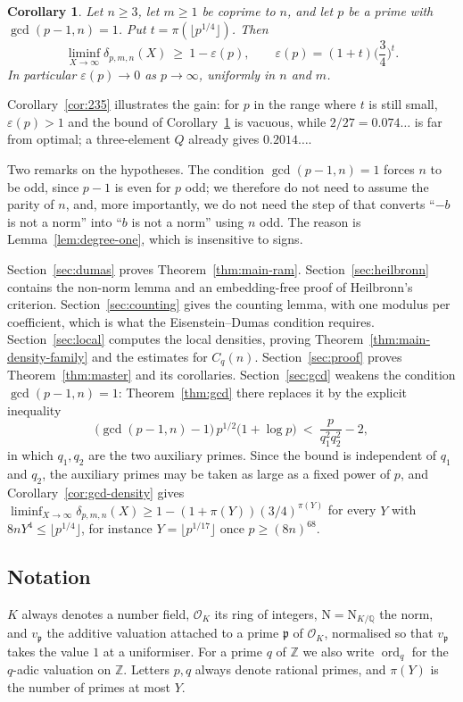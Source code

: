 \documentclass[11pt,reqno]{amsart}
\theoremstyle{plain}
\newtheorem{corollary}[theorem]{Corollary}
\theoremstyle{definition}
\theoremstyle{remark}
\newcommand{\Z}{\mathbb{Z}}
\newcommand{\Q}{\mathbb{Q}}
\newcommand{\OK}{\mathcal{O}_K}
\newcommand{\vp}{v_{\mathfrak{p}}}
\newcommand{\ord}{\operatorname{ord}}
\newcommand{\p}{\mathfrak{p}}
\newcommand{\N}{\mathrm{N}}
\begin{document}
\begin{corollary}\label{cor:eps}
Let $n\ge3$, let $m\ge1$ be coprime to $n$, and let $p$ be a prime with $\gcd(p-1,n)=1$. Put
$t=\pi(\lfloor p^{1/4}\rfloor)$. Then
\[
  \liminf_{X\to\infty}\delta_{p,m,n}(X)\ \ge\ 1-\varepsilon(p),
  \qquad
  \varepsilon(p)=(1+t)\Big(\frac34\Big)^{t} .
\]
In particular $\varepsilon(p)\to0$ as $p\to\infty$, uniformly in $n$ and $m$.
\end{corollary}

Corollary~\ref{cor:235} illustrates the gain: for $p$ in the range where $t$ is still small,
$\varepsilon(p)>1$ and the bound of Corollary~\ref{cor:eps} is vacuous, while $2/27=0.074\ldots$
is far from optimal; a three-element $Q$ already gives $0.2014\ldots$.

Two remarks on the hypotheses. The condition $\gcd(p-1,n)=1$ forces $n$ to be odd, since $p-1$ is
even for $p$ odd; we therefore do not need to assume the parity of $n$, and, more importantly, we
do not need the step of \cite{HMT} that converts ``$-b$ is not a norm'' into ``$b$ is not a norm''
using $n$ odd. The reason is Lemma~\ref{lem:degree-one}, which is insensitive to signs.

Section~\ref{sec:dumas} proves Theorem~\ref{thm:main-ram}. Section~\ref{sec:heilbronn} contains
the non-norm lemma and an embedding-free proof of Heilbronn's criterion.
Section~\ref{sec:counting} gives the counting lemma, with one modulus per coefficient, which is
what the Eisenstein--Dumas condition requires. Section~\ref{sec:local} computes the local
densities, proving Theorem~\ref{thm:main-density-family} and the estimates for $C_q(n)$.
Section~\ref{sec:proof} proves Theorem~\ref{thm:master} and its corollaries. Section~\ref{sec:gcd}
weakens the condition $\gcd(p-1,n)=1$: Theorem~\ref{thm:gcd} there replaces it by the explicit
inequality
\[
  \bigl(\gcd(p-1,n)-1\bigr)\,p^{1/2}\bigl(1+\log p\bigr)\ <\ \frac{p}{q_1^{2}q_2^{2}}-2 ,
\]
in which $q_1,q_2$ are the two auxiliary primes. Since the bound is independent of $q_1$ and
$q_2$, the auxiliary primes may be taken as large as a fixed power of $p$, and
Corollary~\ref{cor:gcd-density} gives
$\liminf_{X\to\infty}\delta_{p,m,n}(X)\ge1-(1+\pi(Y))(3/4)^{\pi(Y)}$ for every $Y$ with
$8nY^{4}\le\lfloor p^{1/4}\rfloor$, for instance $Y=\lfloor p^{1/17}\rfloor$ once
$p\ge(8n)^{68}$.

\subsection*{Notation}
$K$ always denotes a number field, $\OK$ its ring of integers, $\N=\N_{K/\Q}$ the norm, and
$\vp$ the additive valuation attached to a prime $\p$ of $\OK$, normalised so that $\vp$ takes the
value $1$ at a uniformiser. For a prime $q$ of $\Z$ we also write $\ord_q$ for the $q$-adic valuation
on $\Z$. Letters $p,q$ always denote rational primes, and $\pi(Y)$ is the number of primes at
most $Y$.
\end{document}
